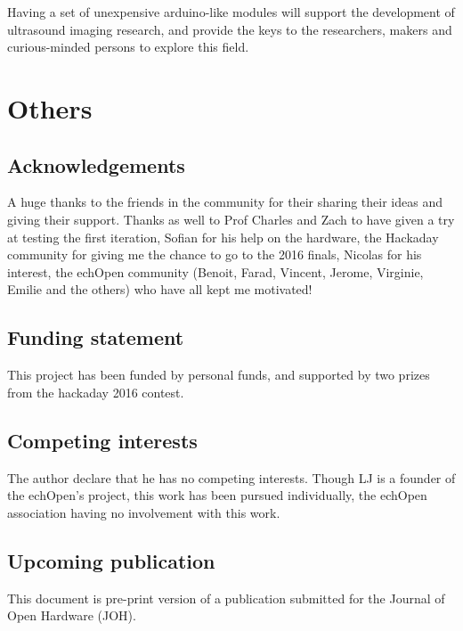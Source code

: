 \documentclass[letterpaper, 10 pt, conference]{ieeeconf} %
\begin{document}
Having a set of unexpensive arduino-like modules will support the development of ultrasound imaging research, and provide the keys to the researchers, makers and curious-minded persons to explore this field.



\section*{Others}

\subsection*{Acknowledgements}

A huge thanks to the friends in the community for their sharing their ideas and giving their support. Thanks as well to Prof Charles and Zach to have given a try at testing the first iteration, Sofian for his help on the hardware, the Hackaday community for giving me the chance to go to the 2016 finals, Nicolas for his interest, the echOpen community (Benoit, Farad, Vincent, Jerome, Virginie, Emilie and the others) who have all kept me motivated!

\subsection*{Funding statement}

This project has been funded by personal funds, and supported by two prizes from the hackaday 2016 contest.

\subsection*{Competing interests}

The author declare that he has no competing interests. Though LJ is a founder of the echOpen's project, this work has been pursued individually, the echOpen association having no involvement with this work.

\subsection*{Upcoming publication}

This document is pre-print version of a publication submitted for the Journal of Open Hardware (JOH).

\addtolength{\textheight}{-12cm}  %
\end{document}
